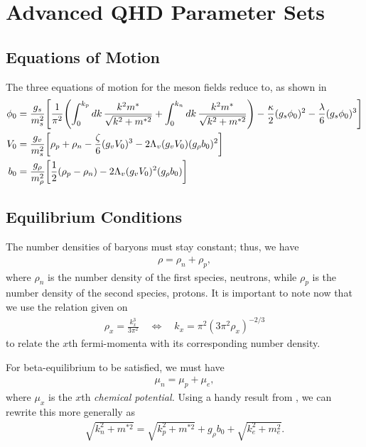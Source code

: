 \chapter{Advanced QHD Parameter Sets}

\section{Equations of Motion}

The three equations of motion for the meson fields reduce to, as shown in \autocite[p. 79]{diener_2008}
\begin{align}
    \phi_0 & = \frac{g_s}{m_s^2}\bqty{\frac{1}{\pi^2} \pqty{\int_0^{k_p} \dd{k} \frac{k^2 m^*}{\sqrt{k^2 + m^{*2}}} + \int_0^{k_n} \dd{k} \frac{k^2 m^*}{\sqrt{k^2 + m^{*2}}}} -\frac{\kappa}{2}(g_s\phi_0)^2 -\frac{\lambda}{6}(g_s\phi_0)^3 }\nonumber\\
    V_0 & = \frac{g_v}{m_s^2} \bqty{\rho_p + \rho_n - \frac{\zeta}{6}(g_v V_0)^3 - 2 \Lambda_v (g_vV_0)(g_\rho b_0)^2}\nonumber\\
    b_0 & = \frac{g_\rho}{m_\rho^2} \bqty{\frac{1}{2}(\rho_p - \rho_n) - 2\Lambda_v(g_vV_0)^2(g_\rho b_0)}
\end{align}

\section{Equilibrium Conditions}

The number densities of baryons must stay constant; thus, we have
\begin{align}
    \rho = \rho_n + \rho_p,
\end{align}
where $\rho_n$ is the number density of the first species, neutrons, while $\rho_p$ is the number density of the second species, protons. It is important to note now that we use the relation given on \autocite[p. 90]{diener_2008}
\begin{align*}
    \rho_x = \frac{k_x^3}{3\pi^2} \quad\Longleftrightarrow\quad k_x = \pi^2 (3\pi^2\rho_x)^{-2/3}
\end{align*}
to relate the $x$th fermi-momenta with its corresponding number density.

For beta-equilibrium to be satisfied, we must have
\begin{align}
    \mu_n = \mu_p + \mu_e,
\end{align}
where $\mu_x$ is the $x$th \textit{chemical potential.} Using a handy result from \autocite[p. 90]{diener_2008}, we can rewrite this more generally as
\begin{align}
    \sqrt{k_n^2 + m^{*2}} = \sqrt{k_p^2 + m^{*2}} + g_\rho b_0 + \sqrt{k_e^2 + m_e^2}.
\end{align}

